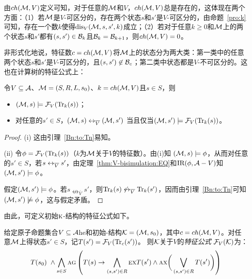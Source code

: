 由$ch({\cal M},V)$定义可知，对于任意的${\cal M}$和$V$，$ch({\cal M},V)$总是存在的，这体现在两个方面：（1）若${\cal M}$是$V$-可区分的，存在两个状态$s$和$s'$是$V$-可区分的，由命题~\ref{pro:k}可知，存在一个数$k$使得$\textrm{dis}_V({\cal M},s,s',k)$成立；（2）若对于任意$k\geq 0$和${\cal M}$上的两个状态$s$和$s'$都有$(s,s')\in {\cal B}_k$且${\cal B}_k ={\cal B}_{k+1}$，则$ch({\cal M},V)=0$。

非形式化地说，特征数$c=ch({\cal M},V)$将${\cal M}$上的状态分为两大类：第一类中的任意两个状态$s$和$s'$是$V$-可区分的，且$(s,s')\not \in {\cal B}_c$；第二类中状态都是$V$-不可区分的。这也在计算树的特征公式上：

\begin{lemma}\label{div_s}
	令$V\subseteq {\cal A}$、${\cal M}=(S,R,L,s_0)$、$k={ch({\cal M},V)}$且$s\in S$，则
	\begin{itemize}
		\item[(i)] $({\cal M}, s)\models {\cal F}_V(\textrm{Tr}_k(s))$；
		\item[(ii)] 对任意的$s'\in S$，$({\cal M},s) \leftrightarrow_{\overline V} ({\cal M},s')$
		当且仅当$({\cal M},s')\models{\cal F}_V(\textrm{Tr}_k(s))$。
	\end{itemize}
\end{lemma}
\begin{proof}
	(i) 这由引理~\ref{Bn:to:Tn}易知。
	
	(ii) 令$\phi = {\cal F}_V(\textrm{Tr}_k(s))$（$k$为${\cal M}$关于$V$的特征数）。由(i)知 $({\cal M}, s) \models \phi$，从而对任意的$s' \in S$，若$s \leftrightarrow_{\overline V} s'$，由定理~\ref{thm:V-bisimulation:EQ}和$\textrm{IR}(\phi, {\cal A} - V)$知$({\cal M}, s') \models \phi$。
	
	假定$({\cal M}, s')\models \phi$。若$s \nleftrightarrow_{\overline V} s'$，则$\textrm{Tr}_k(s) \not \leftrightarrow_{\overline V} \textrm{Tr}_k(s')$，因而由引理~\ref{Bn:to:Tn}可知$({\cal M}, s')\not \models \phi$，这与假定矛盾。
\end{proof}

由此，可定义初始$\textsc{k}$-结构的特征公式如下。

\begin{definition}[特征公式]
	给定原子命题集合$V\subseteq\cal A$he和初始\MPK-结构${\cal K}=({\cal M},s_0)$，其中$c=ch({\cal M},V)$。对任意${\cal M}$上得状态$s' \in S$，记$T(s') = {\cal F}_V(\textrm{Tr}_c(s'))$。
	则$\cal K$关于$V$的{\em 特征公式} ${\cal F}_V({\cal K})$为：
	\[T(s_0) \text{ } \wedge \bigwedge_{s\in S}\textsc{a} \textsc{g}\left(
	T(s) \rightarrow
	\bigwedge_{(s,s')\in R}
	\textsc{e} \textsc{x} T(s')
	\wedge
	\textsc{a} \textsc{x} \bigg(\bigvee_{(s,s')\in R}T(s')\bigg)
	\right)
	\]
	
\end{definition}


